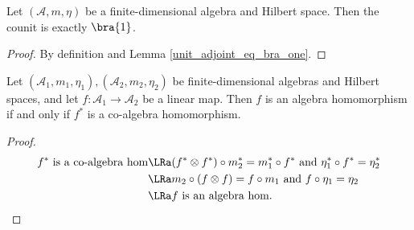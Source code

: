  \begin{lemma}\label{counit_eq_bra_one}
  \leanok
  Let $(\mathcal{A},m,\eta)$ be a finite-dimensional algebra and Hilbert space. Then the counit is exactly $\bra{1}$.
 \end{lemma}
 \begin{proof}\leanok
  By definition and Lemma \ref{unit_adjoint_eq_bra_one}.
 \end{proof}

 \begin{proposition}\label{isAlgHom_iff_adjoint_isCoalgHom}
  \leanok
  Let $(\mathcal{A}_1,m_1,\eta_1),(\mathcal{A}_2,m_2,\eta_2)$ be finite-dimensional algebras and Hilbert spaces, and let $f\colon\mathcal{A}_1\to\mathcal{A}_2$ be a linear map. Then $f$ is an algebra homomorphism if and only if $f^*$ is a co-algebra homomorphism.
 \end{proposition}
 \begin{proof}\leanok
  \begin{align*}
   f^*\text{ is a co-algebra hom} &\LRa (f^*\otimes f^*)\circ m_2^*=m_1^*\circ f^* \text{ and }\eta_1^*\circ f^*=\eta_2^*\\
   &\LRa m_2\circ(f\otimes f)=f\circ m_1\text{ and }f\circ\eta_1=\eta_2\\
   &\LRa f\text{ is an algebra hom}.
  \end{align*}
 \end{proof}

